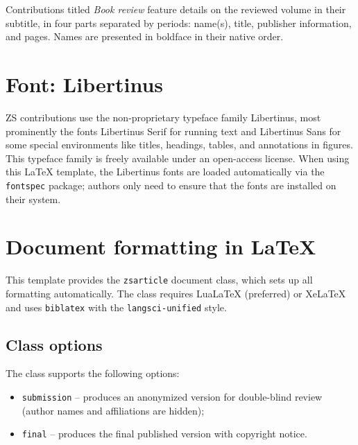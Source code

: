 \documentclass{zsarticle}
\begin{document}
Contributions titled \emph{Book review} feature details on the reviewed volume in their subtitle, in four parts separated by periods: name(s), title, publisher information, and pages. Names are presented in boldface in their native order.

\section{Font: Libertinus}\label{sec:font}

ZS contributions use the non-proprietary typeface family Libertinus, most prominently the fonts Libertinus Serif for running text and Libertinus Sans for some special environments like titles, headings, tables, and annotations in figures. This typeface family is freely available under an open-access license. When using this \LaTeX{} template, the Libertinus fonts are loaded automatically via the \texttt{fontspec} package; authors only need to ensure that the fonts are installed on their system.

\section{Document formatting in \LaTeX}\label{sec:latex}

This template provides the \texttt{zsarticle} document class, which sets up all formatting automatically. The class requires Lua\LaTeX{} (preferred) or Xe\LaTeX{} and uses \texttt{biblatex} with the \texttt{langsci-unified} style.

\subsection{Class options}\label{sec:options}

The class supports the following options:
\begin{itemize}
\item \texttt{submission} -- produces an anonymized version for double-blind review (author names and affiliations are hidden);
\item \texttt{final} -- produces the final published version with copyright notice.
\end{itemize}
\end{document}
